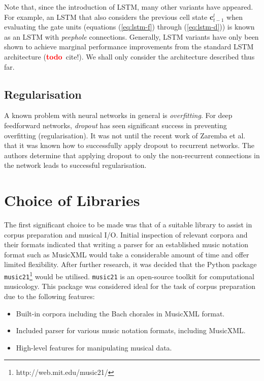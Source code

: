 \documentclass[12pt,a4paper,twoside,openright]{report}
\newcommand{\vect}[1]{\boldsymbol{\mathbf{#1}}}
\newcommand{\todo}{\textcolor{red}{\textbf{todo}~}}
\begin{document}
Note that, since the introduction of LSTM, many other variants have appeared.
For example, an LSTM that also considers the previous cell state
$\vect{c}_{t-1}^l$ when evaluating the gate units (equations (\ref{eq:lstm-f})
through (\ref{eq:lstm-d})) is known as an LSTM with \emph{peephole} connections.
Generally, LSTM variants have only been shown to achieve marginal performance
improvements from the standard LSTM architecture (\todo cite!). We shall only
consider the architecture described thus far.

\subsection{Regularisation}

A known problem with neural networks in general is \emph{overfitting}. For deep
feedforward networks, \emph{dropout} \cite{srivastava2014dropout} has seen
significant success in preventing overfitting (regularisation). It was not until
the recent work of Zaremba et al.\ \cite{zaremba2014recurrent} that it was known
how to successfully apply dropout to recurrent networks. The authors determine
that applying dropout to only the non-recurrent connections in the network leads
to successful regularisation. 

\section{Choice of Libraries}

The first significant choice to be made was that of a suitable library to assist
in corpus preparation and musical I/O. Initial inspection of relevant corpora
and their formats indicated that writing a parser for an established music
notation format such as MusicXML would take a considerable amount of time and
offer limited flexibility. After further research, it was decided that the
Python package \texttt{music21}\footnote{http://web.mit.edu/music21/} would be
utilised. \texttt{music21} is an open-source toolkit for computational
musicology. This package was considered ideal for the task of corpus preparation
due to the following features:
\begin{itemize}
  \item Built-in corpora including the Bach chorales in MusicXML format.
  \item Included parser for various music notation formats, including MusicXML.
  \item High-level features for manipulating musical data.
\end{itemize}
\end{document}
